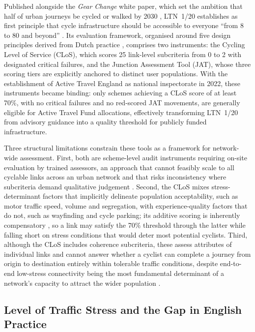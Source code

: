 \documentclass[final,5p,times,twocolumn,authoryear]{elsarticle}
\begin{document}
Published alongside the \textit{Gear Change} white paper, which set the ambition that half of urban journeys be cycled or walked by 2030 \citep{departmentfortransport2020}, LTN~1/20 establishes as first principle that cycle infrastructure should be accessible to everyone ``from 8 to 80 and beyond'' \citep{departmentfortransport2020a}. Its evaluation framework, organised around five design principles derived from Dutch practice \citep{crow2016}, comprises two instruments: the Cycling Level of Service (CLoS), which scores 25 link-level subcriteria from 0 to 2 with designated critical failures, and the Junction Assessment Tool (JAT), whose three scoring tiers are explicitly anchored to distinct user populations. With the establishment of Active Travel England as national inspectorate in 2022, these instruments became binding: only schemes achieving a CLoS score of at least 70\%, with no critical failures and no red-scored JAT movements, are generally eligible for Active Travel Fund allocations, effectively transforming LTN~1/20 from advisory guidance into a quality threshold for publicly funded infrastructure.

Three structural limitations constrain these tools as a framework for network-wide assessment. First, both are scheme-level audit instruments requiring on-site evaluation by trained assessors, an approach that cannot feasibly scale to all cyclable links across an urban network and that risks inconsistency where subcriteria demand qualitative judgement \citep{hancock2024}. Second, the CLoS mixes stress-determinant factors that implicitly delineate population acceptability, such as motor traffic speed, volume and segregation, with experience-quality factors that do not, such as wayfinding and cycle parking; its additive scoring is inherently compensatory \citep{pais2022, wang2022}, so a link may satisfy the 70\% threshold through the latter while falling short on stress conditions that would deter most potential cyclists. Third, although the CLoS includes coherence subcriteria, these assess attributes of individual links and cannot answer whether a cyclist can complete a journey from origin to destination entirely within tolerable traffic conditions, despite end-to-end low-stress connectivity being the most fundamental determinant of a network's capacity to attract the wider population \citep{mekuria2012a, wang2016, lowry2017}.

\subsection{Level of Traffic Stress and the Gap in English Practice}
\label{sec:lts-gap}
\end{document}
